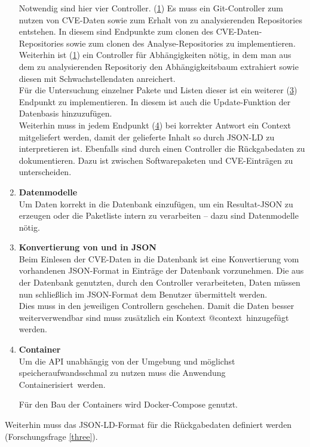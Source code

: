 \begin{enumerate}
            Notwendig sind hier vier Controller.
            (\hyperref[api_controller:one]{1}) Es muss ein Git-Controller zum nutzen von \ac{CVE}-Daten sowie zum Erhalt von zu analysierenden Repositories entstehen.
            In diesem sind Endpunkte zum clonen des \ac{CVE}-Daten-Repositories sowie zum clonen des Analyse-Repositories zu implementieren. %
            \\
            Weiterhin ist (\hyperref[api_controller:two]{1}) ein Controller für Abhängigkeiten nötig, in dem man aus dem zu analysierenden Repositoriy den Abhängigkeitsbaum extrahiert sowie diesen mit Schwachstellendaten anreichert.
            \\
            Für die Untersuchung einzelner Pakete und Listen dieser ist ein weiterer (\hyperref[api_controller:three]{3}) Endpunkt zu implementieren.
            In diesem ist auch die Update-Funktion der Datenbasis hinzuzufügen.
            \\
            Weiterhin muss in jedem Endpunkt (\hyperref[api_controller:four]{4}) bei korrekter Antwort ein Context mitgeliefert werden, damit der gelieferte Inhalt so durch JSON-LD zu interpretieren ist.
            Ebenfalls sind durch einen Controller die Rückgabedaten zu dokumentieren.
            Dazu ist zwischen Softwarepaketen und \ac{CVE}-Einträgen zu unterscheiden.
        \item \textbf{Datenmodelle} \label{arch_4}\\
            Um Daten korrekt in die Datenbank einzufügen, um ein Resultat-JSON zu erzeugen oder die Paketliste intern zu verarbeiten -- dazu sind Datenmodelle nötig.
        \item \textbf{Konvertierung von und in JSON} \label{arch_5}\\
            Beim Einlesen der \ac{CVE}-Daten in die Datenbank ist eine Konvertierung vom vorhandenen JSON-Format in Einträge der Datenbank vorzunehmen.
            Die aus der Datenbank genutzten, durch den Controller verarbeiteten, Daten müssen nun schließlich im JSON-Format dem Benutzer übermittelt werden.
            \\
            Dies muss in den jeweiligen Controllern geschehen.
            Damit die Daten besser weiterverwendbar sind muss zusätzlich ein Kontext \glqq @context\grqq~hinzugefügt werden.
        \item \textbf{Container} \\
            Um die \ac{API} unabhängig von der Umgebung und möglichst speicheraufwandsschmal zu nutzen muss die Anwendung \glqq Containerisiert\grqq~werden.

            Für den Bau der Containers wird Docker-Compose genutzt.
    \end{enumerate}
    Weiterhin muss das JSON-LD-Format für die Rückgabedaten definiert werden (Forschungsfrage \ref{three}).
